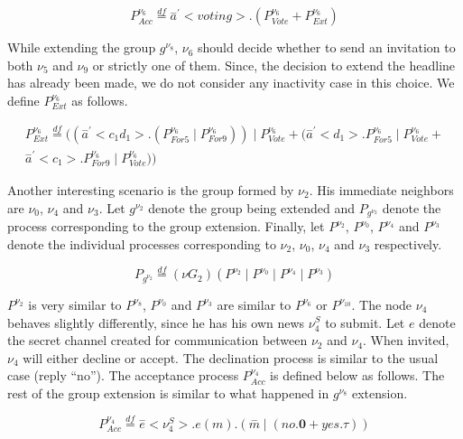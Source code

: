 \begin{equation}
	\label{eq:pv6expr3}
	P^{\nu_6}_{Acc} \overset{df}{=}\overset{-}{a}^\prime<voting>.(P^{\nu_6}_{Vote} + P^{\nu_6}_{Ext}) 
\end{equation}

While extending the group $g^{\nu_8}$, $\nu_6$ should decide whether to send an invitation to both $\nu_5$ and $\nu_9$
or strictly one of them. Since, the decision to extend the headline has already been made, we do not consider any inactivity case in this choice. We define $P^{\nu_6}_{Ext}$ as follows.

\begin{equation}
	\label{eq:pv6expr4}
	\begin{gathered}
P^{\nu_6}_{Ext}\overset{df}{=}((\overset{-}{a}^\prime<c_1d_1>.(P^{\nu_6}_{For5}\mid P^{\nu_6}_{For9}))\mid P^{\nu_6}_{Vote} + (\overset{-}{a}^\prime<d_1>.P^{\nu_6}_{For5}\mid P^{\nu_6}_{Vote} +\\ \overset{-}{a}^\prime<c_1>.P^{\nu_6}_{For9}\mid P^{\nu_6}_{Vote}))
	\end{gathered}
\end{equation}

Another interesting scenario is the group formed by $\nu_2$. His immediate neighbors are $\nu_0$, $\nu_4$ and $\nu_3$. Let $g^{\nu_2}$ denote the group being extended and $P_{g^{\nu_2}}$ denote the process corresponding to the group extension. Finally, let $P^{\nu_2}$, $P^{\nu_0}$, $P^{\nu_4}$ and $P^{\nu_3}$ denote the individual processes corresponding to $\nu_2$, $\nu_0$, $\nu_4$ and $\nu_3$ respectively.

\begin{equation}
	\label{eq:gv2-formation}
	\boxed{P_{g^{\nu_2}}\overset{df}{=}(\nu G_2)(P^{\nu_2}\mid P^{\nu_0} \mid P^{\nu_4} \mid P^{\nu_3})}
\end{equation}

$P^{\nu_2}$ is very similar to $P^{\nu_8}$, $P^{\nu_0}$ and $P^{\nu_3}$ are similar to $P^{\nu_6}$ or $P^{\nu_{10}}$. The
node $\nu_4$ behaves slightly differently, since he has his own news $\nu_4^S$ to submit. Let $e$ denote the secret
channel created for communication between $\nu_2$ and $\nu_4$. When invited, $\nu_4$ will either decline or accept. The
declination process is similar to the usual case (reply ``no''). The acceptance process $P^{\nu_4}_{Acc}$ is defined
below as follows. The rest of the group extension is similar to what happened in $g^{\nu_8}$ extension.

\begin{equation}
	\label{eq:pv4expracc}
	P^{\nu_4}_{Acc} \overset{df}{=} \overset{-}{e}<\nu_4^S>.e(m).(\overset{-}{m}\mid (no.\mathbf{0} + yes.\tau))
\end{equation}

